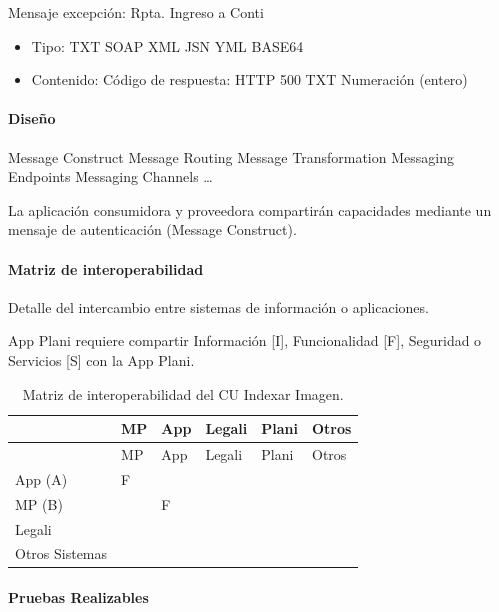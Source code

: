 \documentclass[
  paper=a4,
  ,captions=tableheading
]{scrartcl}
\providecommand{\tightlist}{%
  \setlength{\itemsep}{0pt}\setlength{\parskip}{0pt}}
\begin{document}
Mensaje excepción: Rpta. Ingreso a Conti

\begin{itemize}
\tightlist
\item
  Tipo: TXT \textbar{} SOAP \textbar{} XML \textbar{} JSN \textbar{} YML
  \textbar{} BASE64
\item
  Contenido: Código de respuesta: HTTP 500 \textbar{} TXT \textbar{}
  Numeración (entero)
\end{itemize}

\paragraph{Diseño}\label{sec:diseuxf1o-1}

Message Construct \textbar{} Message Routing \textbar{} Message
Transformation \textbar{} Messaging Endpoints \textbar{} Messaging
Channels \textbar{} \ldots{}

La aplicación consumidora y proveedora compartirán capacidades mediante
un mensaje de autenticación (Message Construct).

\paragraph{Matriz de
interoperabilidad}\label{sec:matriz-de-interoperabilidad-1}

Detalle del intercambio entre sistemas de información o aplicaciones.

App Plani requiere compartir Información {[}I{]}, Funcionalidad {[}F{]},
Seguridad o Servicios {[}S{]} con la App Plani.

\begin{longtable}[]{@{}llllll@{}}
\caption{Matriz de interoperabilidad del CU Indexar
Imagen.}\tabularnewline
\toprule\noalign{}
& MP & App & Legali & Plani & Otros \\
\midrule\noalign{}
\endfirsthead
\toprule\noalign{}
& MP & App & Legali & Plani & Otros \\
\midrule\noalign{}
\endhead
\bottomrule\noalign{}
\endlastfoot
App (A) & F & & & & \\
MP (B) & & F & & & \\
Legali & & & & & \\
Otros Sistemas & & & & & \\
\end{longtable}

\paragraph{Pruebas Realizables}\label{sec:pruebas-realizables-1}
\end{document}
